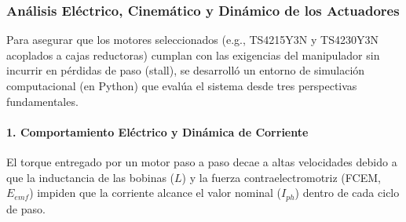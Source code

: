 \documentclass[12pt, a4paper]{article}
\begin{document}
\begin{table}[H]
\centering
\caption{Especificaciones nominales de los motores paso a paso NEMA 17 seleccionados.}
\label{tab:motores_seleccionados}
\end{table}

\subsubsection{Análisis Eléctrico, Cinemático y Dinámico de los Actuadores}

Para asegurar que los motores seleccionados (e.g., TS4215Y3N y TS4230Y3N acoplados a cajas reductoras) cumplan con las exigencias del manipulador sin incurrir en pérdidas de paso (stall), se desarrolló un entorno de simulación computacional (en Python) que evalúa el sistema desde tres perspectivas fundamentales.

\paragraph{1. Comportamiento Eléctrico y Dinámica de Corriente}
El torque entregado por un motor paso a paso decae a altas velocidades debido a que la inductancia de las bobinas ($L$) y la fuerza contraelectromotriz (FCEM, $E_{emf}$) impiden que la corriente alcance el valor nominal ($I_{ph}$) dentro de cada ciclo de paso. 
\end{document}
